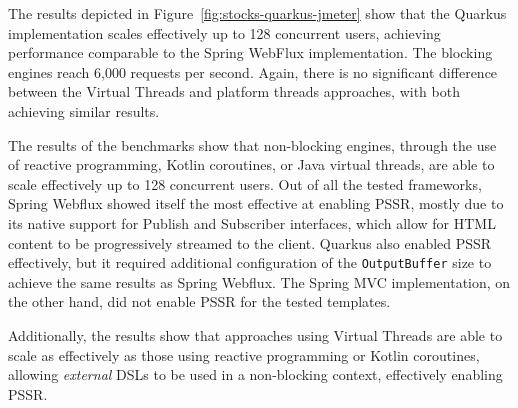 The results depicted in Figure~\ref{fig:stocks-quarkus-jmeter} show that the
Quarkus implementation scales effectively up to 128 concurrent users, achieving
performance comparable to the Spring WebFlux implementation. The blocking
engines reach 6,000 requests per second. Again, there is no significant
difference between the Virtual Threads and platform threads approaches, with
both achieving similar results.

The results of the benchmarks show that non-blocking engines, through the use
of reactive programming, Kotlin coroutines, or Java virtual threads, are able
to scale effectively up to 128 concurrent users. Out of all the tested
frameworks, Spring Webflux showed itself the most effective at enabling PSSR,
mostly due to its native support for Publish and Subscriber interfaces, which
allow for HTML content to be progressively streamed to the client. Quarkus also
enabled PSSR effectively, but it required additional configuration of the
\texttt{OutputBuffer} size to achieve the same results as Spring Webflux. The
Spring MVC implementation, on the other hand, did not enable PSSR for the
tested templates.

Additionally, the results show that approaches using Virtual Threads are able
to scale as effectively as those using reactive programming or Kotlin
coroutines, allowing \textit{external} DSLs to be used in a non-blocking context, 
effectively enabling PSSR\@. 
